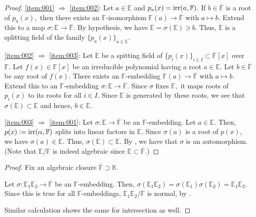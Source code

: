 \normalequivalent*\label{thm:normalequivalent2}
\begin{flushright}\hyperref[thm:normalequivalent]{\upsym}\end{flushright}
\begin{proof}
    \ref{item:001} $\Rightarrow$ \ref{item:002}: Let $a \in \mathbb{E}$ and $p_a(x) = \operatorname{irr}(a, \mathbb{F}).$ If $b \in \overline{\mathbb{F}}$ is a root of $p_a(x),$ then there exists an $\mathbb{F}$-isomorphism $\mathbb{F}(a) \to \overline{\mathbb{F}}$ with $a \mapsto b.$ Extend this to a map $\sigma : \mathbb{E} \to \overline{\mathbb{F}}.$ By hypothesis, we have $\mathbb{E} = \sigma(\mathbb{E}) \ni b.$ Thus, $\mathbb{E}$ is a splitting field of the family $\{p_a(x)\}_{a \in \mathbb{E}}.$

    \ref{item:002} $\Rightarrow$ \ref{item:003}: Let $\mathbb{E}$ be a spitting field of $\{p_i(x)\}_{i \in I} \subset \mathbb{F}[x]$ over $\mathbb{F}.$ Let $f(x) \in \mathbb{F}[x]$ be an irreducible polynomial having a root $a \in \mathbb{E}.$ Let $b \in \overline{\mathbb{F}}$ be any root of $f(x).$ There exists an $\mathbb{F}$-embedding $\mathbb{F}(a) \to \overline{\mathbb{F}}$ with $a \mapsto b.$ Extend this to an $\mathbb{F}$-embedding $\sigma : \mathbb{E} \to \overline{\mathbb{F}}.$ Since $\sigma$ fixes $\mathbb{F},$ it maps roots of $p_i(x)$ to its roots for all $i \in I.$ Since $\mathbb{E}$ is generated by these roots, we see that $\sigma(\mathbb{E}) \subset \mathbb{E}$ and hence, $b \in \mathbb{E}.$

    \ref{item:003} $\Rightarrow$ \ref{item:001}: Let $\sigma : \mathbb{E} \to \overline{\mathbb{F}}$ be an $\mathbb{F}$-embedding. Let $a \in \mathbb{E}.$ Then, $p(x) \vcentcolon= \operatorname{irr}(\alpha, \mathbb{F})$ splits into linear factors in $\mathbb{E}.$ Since $\sigma(a)$ is a root of $p(x),$ we have $\sigma(a) \in \mathbb{E}.$ Thus, $\sigma(\mathbb{E}) \subset \mathbb{E}.$ By , we have that $\sigma$ is an automorphism. (Note that $\mathbb{E}/\mathbb{F}$ is indeed algebraic since $\mathbb{E} \subset \overline{\mathbb{F}}.$)
\end{proof}

\operationsonnormalexts*\label{prop:operationsonnormalexts2}
\begin{flushright}\hyperref[prop:operationsonnormalexts]{\upsym}\end{flushright}
\begin{proof}
    Fix an algebraic closure $\overline{\mathbb{F}} \supset \mathbb{K}.$

    Let $\sigma : \mathbb{E}_1\mathbb{E}_2 \to \overline{\mathbb{F}}$ be an $\mathbb{F}$-embedding. Then, $\sigma(\mathbb{E}_1\mathbb{E}_2) = \sigma(\mathbb{E}_1)\sigma(\mathbb{E}_2) = \mathbb{E}_1\mathbb{E}_2.$ Since this is true for all $\mathbb{F}$-embeddings, $\mathbb{E}_1\mathbb{E}_2/\mathbb{F}$ is normal, by .

    Similar calculation shows the same for intersection as well.
\end{proof}

